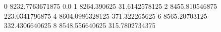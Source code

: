0 8232.7763671875 0.0
1 8264.390625 31.6142578125
2 8455.810546875 223.0341796875
4 8604.0986328125 371.322265625
6 8565.20703125 332.4306640625
8 8548.556640625 315.7802734375
